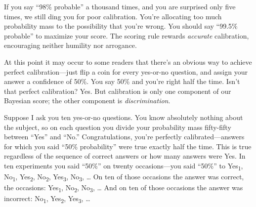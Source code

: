 {
 If you say ``98\% probable'' a
thousand times, and you are surprised only five times, we still ding
you for poor calibration. You're allocating too much
probability mass to the possibility that you're wrong.
You should say ``99.5\% probable''
to maximize your score. The scoring rule rewards \textit{accurate}
calibration, encouraging neither humility nor arrogance.}

{
 At this point it may occur to some readers that
there's an obvious way to achieve perfect
calibration---just flip a coin for every yes-or-no question, and assign
your answer a confidence of 50\%. You say 50\% and
you're right half the time. Isn't that
perfect calibration? Yes. But calibration is only one component of our
Bayesian score; the other component is \textit{discrimination}.}

{
 Suppose I ask you ten yes-or-no questions. You know absolutely
nothing about the subject, so on each question you divide your
probability mass fifty-fifty between
``Yes'' and
``No.'' Congratulations,
you're perfectly calibrated---answers for which you
said ``50\% probability'' were true
exactly half the time. This is true regardless of the sequence of
correct answers or how many answers were Yes. In ten experiments you
said ``50\%'' on twenty
occasions---you said ``50\%'' to
Yes\textsubscript{1}, No\textsubscript{1}, Yes\textsubscript{2},
No\textsubscript{2}, Yes\textsubscript{3}, No\textsubscript{3}, \ldots
On ten of those occasions the answer was correct, the occasions:
Yes\textsubscript{1}, No\textsubscript{2}, No\textsubscript{3}, \ldots
And on ten of those occasions the answer was incorrect:
No\textsubscript{1}, Yes\textsubscript{2}, Yes\textsubscript{3}, \ldots}

